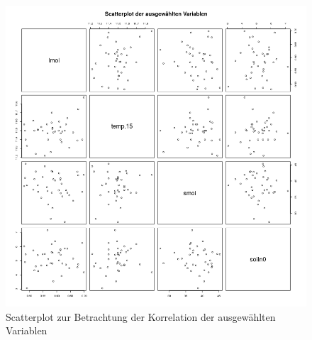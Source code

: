 \begin{figure}[ht]
	\centering
	\includegraphics[width=\textwidth]{fig/model/scatterplot-pearson-normalverteilt.png}
	\caption{Scatterplot zur Betrachtung der Korrelation der ausgewählten Variablen}
	\label{fig:scatter-top4}
\end{figure}

